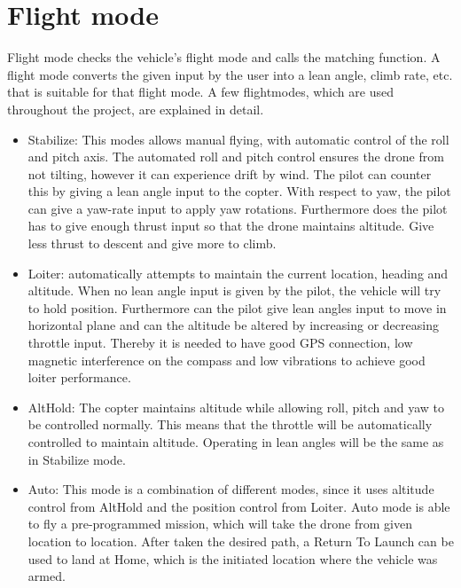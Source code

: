 \section{Flight mode}
Flight mode checks the vehicle's flight mode and calls the matching function. A flight mode converts the given input by the user into a lean angle, climb rate, etc. that is suitable for that flight mode. A few flightmodes, which are used throughout the project, are explained in detail.
\begin{itemize}
\item Stabilize: This modes allows manual flying, with automatic control of the roll and pitch axis. The automated roll and pitch control ensures the drone from not tilting, however it can experience drift by wind. The pilot can counter this by giving a lean angle input to the copter. With respect to yaw, the pilot can give a yaw-rate input to apply yaw rotations. Furthermore does the pilot has to give enough thrust input so that the drone maintains altitude. Give less thrust to descent and give more to climb.\\

\item Loiter: automatically attempts to maintain the current location, heading and altitude. When no lean angle input is given by the pilot, the vehicle will try to hold position. Furthermore can the pilot give lean angles input to move in horizontal plane and can the altitude be altered by increasing or decreasing throttle input. Thereby it is needed to have good GPS connection, low magnetic interference on the compass and low vibrations to achieve good loiter performance.\\

\item AltHold: The copter maintains altitude while allowing roll, pitch and yaw to be controlled normally. This means that the throttle will be automatically controlled to maintain altitude. Operating in lean angles will be the same as in Stabilize mode.\\

\item Auto: This mode is a combination of different modes, since it uses altitude control from AltHold and the position control from Loiter. Auto mode is able to fly a pre-programmed mission, which will take the drone from given location to location. After taken the desired path, a Return To Launch can be used to land at Home, which is the initiated location where the vehicle was armed.\\
\end{itemize}

